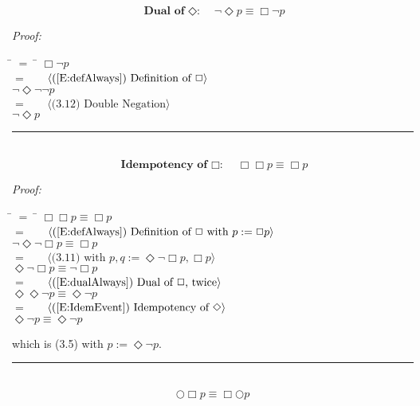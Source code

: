 \documentclass[fleqn, leqno]{article}
\newcommand{\lgap}{2pt}                             %
\newcommand{\mymathindent}{24pt}                      %
\newcommand{\myqed}{\hfill\rule[-.23ex]{1.2ex}{2.0ex}}
\newcommand{\Gll} {\langle}                         %
\newcommand{\Ggg} {\rangle}                         %
\newcommand{\Hint}[1]     {\ \ \ $\Gll              \mbox{#1} \Ggg$ }   %
\begin{document}
\begin{equation}\label{E:dualEvent}
\textbf{Dual of $\Diamond$:}\quad \lnot\Diamond p \equiv \Box\lnot p
\end{equation}

\emph{Proof:}
\begin{tabbing}
\hspace{\mymathindent} \= $= \;$ \= \kill
  \> \>   $\Box\lnot p$\\[\lgap]
  \> $=$  \>  \Hint{(\ref{E:defAlways}) Definition of $\Box$}\\[\lgap]
  \> \>   $\lnot\Diamond\lnot\lnot p$\\[\lgap]
  \> $=$  \>  \Hint{(3.12) Double Negation}\\[\lgap]
  \> \>   $\lnot\Diamond p$\\[\lgap]
\end{tabbing}
\myqed\\[\lgap]


\begin{equation}\label{E:IdemAlways}
\textbf{Idempotency of $\Box$:}\quad \Box\Box p \equiv \Box p
\end{equation}

\emph{Proof:}
\begin{tabbing}
\hspace{\mymathindent} \= $= \;$ \= \kill
  \> \>   $\Box\Box p \equiv \Box p$\\[\lgap]
  \> $=$  \>  \Hint{(\ref{E:defAlways}) Definition of $\Box$ with $p := \Box p$}\\[\lgap]
  \> \>   $\lnot\Diamond\lnot\Box p \equiv \Box p$\\[\lgap]
  \> $=$  \>  \Hint{(3.11) with $p,q := \Diamond\lnot\Box p, \Box p$}\\[\lgap]
  \> \>   $\Diamond\lnot\Box p \equiv \lnot\Box p$\\[\lgap]
  \> $=$  \>  \Hint{(\ref{E:dualAlways}) Dual of $\Box$, twice}\\[\lgap]
  \> \>   $\Diamond\Diamond\lnot p \equiv \Diamond\lnot p$\\[\lgap]
  \> $=$  \>  \Hint{(\ref{E:IdemEvent}) Idempotency of $\Diamond$}\\[\lgap]
  \> \>   $\Diamond\lnot p \equiv \Diamond\lnot p$\\[\lgap]
\end{tabbing}
which is (3.5) with $p := \Diamond\lnot p$. \myqed\\[\lgap]


\begin{equation}\label{E:dNextAlways}
\bigcirc\Box p \equiv \Box\bigcirc p
\end{equation}
\end{document}
